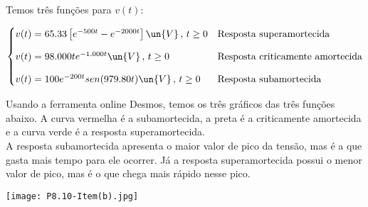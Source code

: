 Temos três funções para $v(t)$:

\[ \begin{cases}
        v(t) = 65.33\left[e^{-500t} - e^{-2000t}\right] \un{V} \, , \, t \geq 0  & \textrm{Resposta superamortecida} \\
        \noalign{\vskip9pt}
        v(t) = 98.000te^{-1.000t} \un{V} \, , \, t \geq 0 & \textrm{Resposta criticamente amortecida} \\
        \noalign{\vskip9pt}
        v(t) = 100e^{-200t} sen (979.80t) \un{V} \, , \, t \geq 0 & \textrm{Resposta subamortecida} \\
    \end{cases}
\]

Usando a ferramenta online Desmos, temos os três gráficos das três funções abaixo. A curva vermelha é a subamortecida, a
preta é a criticamente amortecida e a curva verde é a resposta superamortecida. \\
A resposta subamortecida apresenta o maior valor de pico da tensão, mas é a que gasta mais tempo para ele ocorrer. 
Já a resposta superamortecida possui o menor valor de pico, mas é o que chega mais rápido nesse pico.

\begin{center}
    \texttt{[image: P8.10-Item(b).jpg]}
\end{center}






